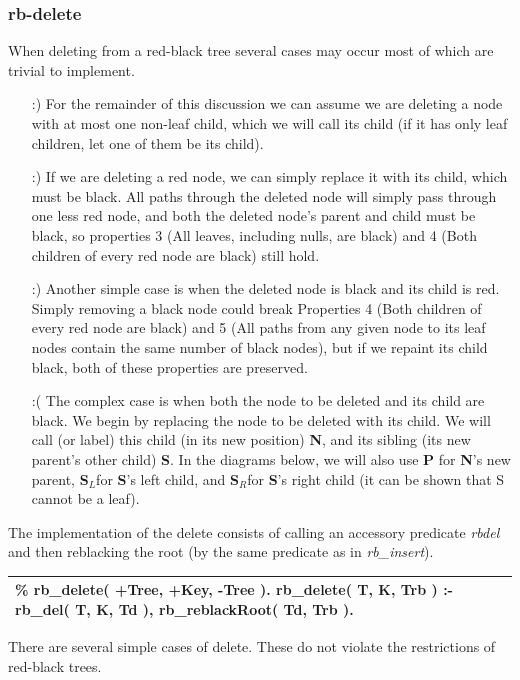 \documentclass{article}
\newenvironment{code}{\obeycr\begin{it}\nopagebreak\addvspace{1ex}\noindent\footnotesize\begin{tabular}{|p{0.95\textwidth}|}\hline}{\\\hline\end{tabular}\par\addvspace{1ex}\end{it}\restorecr}
\newcommand{\inlinecode}[1]{\textit{#1}}
\newcommand{\Sl}{\textbf{S$_{L}$}}
\newcommand{\Sr}{\textbf{S$_{R}$}}
\begin{document}
\subsubsection{rb-delete}
When deleting from a red-black tree several cases may occur most of which are trivial to implement.
\begin{itemize}
\item[:)]
For the remainder of this discussion we can assume we are deleting a node with at most one non-leaf child, which we will call its child (if it has only leaf children, let one of them be its child).
\item[:)]
If we are deleting a red node, we can simply replace it with its child, which must be black. All paths through the deleted node will simply pass through one less red node, and both the deleted node's parent and child must be black, so properties 3 (All leaves, including nulls, are black) and 4 (Both children of every red node are black) still hold.
\item[:)]
Another simple case is when the deleted node is black and its child is red. Simply removing a black node could break Properties 4 (Both children of every red node are black) and 5 (All paths from any given node to its leaf nodes contain the same number of black nodes), but if we repaint its child black, both of these properties are preserved.
\item[:(]
The complex case is when both the node to be deleted and its child are black. We begin by replacing the node to be deleted with its child. We will call (or label) this child (in its new position) \textbf{N}, and its sibling (its new parent's other child) \textbf{S}. In the diagrams below, we will also use \textbf{P} for \textbf{N}'s new parent, \Sl for \textbf{S}'s left child, and \Sr for \textbf{S}'s right child (it can be shown that S cannot be a leaf).
\end{itemize}

The implementation of the delete consists of calling an accessory predicate \inlinecode{rb\-del} and then reblacking the root (by the same predicate as in \inlinecode{rb\_insert}).

\begin{code}
\% rb\_delete( +Tree, +Key, -Tree ).
rb\_delete( T, K, Trb ) :-
\hspace{2ex}rb\_del( T, K, Td ), 
\hspace{2ex}rb\_reblackRoot( Td, Trb ).
\end{code}

There are several simple cases of delete. These do not violate the restrictions of red-black trees.
\end{document}
